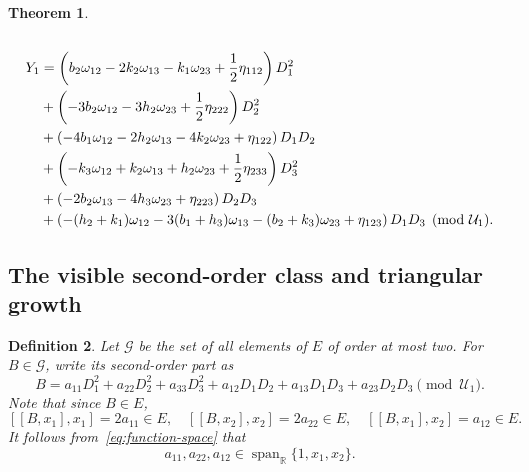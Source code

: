 \documentclass[11pt,a4paper]{article}
\numberwithin{equation}{section}
\theoremstyle{journalplain}
\newtheorem{theorem}{Theorem}[section]
\theoremstyle{journaldef}
\newtheorem{definition}[theorem]{Definition}
\DeclareMathOperator{\Span}{span}
\newcommand{\R}{\mathbb R}
\begin{document}
\begin{theorem}
\begin{itemize}
\begin{align}
\end{align}
\begin{align}
Y_1&=
\left(
b_2\omega_{12}
-2k_2\omega_{13}
-k_1\omega_{23}
+\frac12\eta_{112}
\right)D_1^2\notag\\
&+\left(
-3b_2\omega_{12}
-3h_2\omega_{23}
+\frac12\eta_{222}
\right)D_2^2\notag\\
&+\left(
-4b_1\omega_{12}
-2h_2\omega_{13}
-4k_2\omega_{23}
+\eta_{122}
\right)D_1D_2\notag\\
&+\left(
-k_3\omega_{12}
+k_2\omega_{13}
+h_2\omega_{23}
+\frac12\eta_{233}
\right)D_3^2\notag\\
&+\left(
-2b_2\omega_{13}
-4h_3\omega_{23}
+\eta_{223}
\right)D_2D_3\notag\\
&+\left(
-(h_2+k_1)\omega_{12}
-3(b_1+h_3)\omega_{13}
-(b_2+k_3)\omega_{23}
+\eta_{123}
\right)D_1D_3 \pmod{\mathcal U_1}.
\end{align}
\end{itemize}
\end{theorem}

\subsection{The visible second-order class and triangular growth}

\begin{definition}\label{def:G}
Let $\mathcal G$ be the set of all elements of $E$ of order at most two.  For
$B\in\mathcal G$, write its second-order part as
\begin{equation}
B=a_{11}D_1^2+a_{22}D_2^2+a_{33}D_3^2+a_{12}D_1D_2
 +a_{13}D_1D_3+a_{23}D_2D_3
\pmod{\mathcal U_1}.
\label{eq:G-form}
\end{equation}
Note that since $B\in E$,
\[
[[B,x_1],x_1]=2a_{11} \in E,
\quad [[B,x_2],x_2]=2a_{22} \in E,
\quad [[B,x_1],x_2]=a_{12} \in E.
\]
It follows from~\eqref{eq:function-space} that
\[
a_{11},a_{22},a_{12}\in\Span_\R\{1,x_1,x_2\}.
\]
\end{definition}
\end{document}
